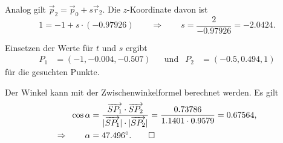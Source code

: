 \begin{loesung}
\begin{teilaufgaben}
Analog gilt $\vec{p}_2=\vec{p}_0+s\vec{r}_2$.
Die $z$-Koordinate davon ist
\[
1=-1+s\cdot (-0.97926)
\qquad\Rightarrow\qquad
s = \frac2{-0.97926}=-2.0424.
\]

Einsetzen der Werte für $t$ und $s$ ergibt
\[
\begin{aligned}
P_1&=(-1, -0.004, -0.507)
&&\text{und}&
P_2&=(-0.5,0.494, 1)
\end{aligned}
\]
für die gesuchten Punkte.
\item
Der Winkel kann mit der Zwischenwinkelformel berechnet werden.
Es gilt
\begin{align*}
\cos\alpha
&=
\frac{\overrightarrow{SP_1}\cdot\overrightarrow{SP_2}}{|\overrightarrow{SP_1}|\cdot|\overrightarrow{SP_2}|}
=
\frac{0.73786}{1.1401\cdot 0.9579} = 0.67564,
\\
\Rightarrow\qquad
\alpha
&=
47.496^\circ.
\qedhere
\end{align*}
\end{teilaufgaben}
\end{loesung}

